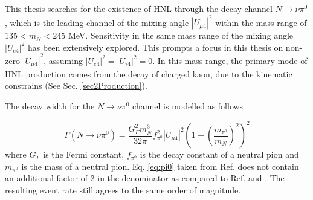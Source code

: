 This thesis searches for the existence of HNL through the decay channel $N\rightarrow\nu \pi^{0}$, which is the leading channel of the mixing angle $|U_{\mu4}|^{2}$ within the mass range of $ 135 < m_{N} < 245 $ MeV.
Sensitivity in the same mass range of the mixing angle $|U_{e4}|^{2}$ has been extensively explored.
This prompts a focus in this thesis on non-zero $|U_{\mu4}|^{2}$, assuming $|U_{e4}|^{2} = |U_{\tau4}|^{2} = 0$.  
In this mass range, the primary mode of HNL production comes from  the decay of charged kaon, due to the kinematic constrains (See Sec. \ref{sec2Production}). 

The decay width for the $N\rightarrow\nu \pi^{0}$ channel is modelled as follows \cite{HNLZarko}

\begin{equation}
	\Gamma(N\rightarrow \nu \pi^{0}) = \frac{G_{F}^{2}m_{N}^{3}}{32\pi}f^{2}_{\pi^{0}}|U_{\mu4}|^{2}\left(1-\left(\frac{m_{\pi^{0}}}{m_{N}}\right)^{2}\right)^{2}
\label{eq:pi0}
\end{equation}
where $G_{F}$ is the Fermi constant, $f_{\pi^{0}}$ is the decay constant of a neutral pion and $m_{\pi^{0}}$ is the mass of a neutral pion.
Eq. \ref{eq:pi0} taken from Ref. \cite{HNLZarko} does not contain an additional factor of 2 in the denominator as compared to Ref. \cite{SBNHNL} and \cite{HNLBin}.
The resulting event rate still agrees to the same order of magnitude.

